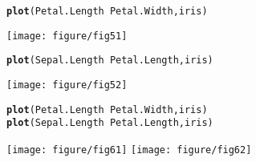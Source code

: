\documentclass{article}\usepackage[]{graphicx}\usepackage[]{color}
\makeatletter
\newcommand{\hlopt}[1]{\textcolor[rgb]{0,0,0}{#1}}%
\newcommand{\hlstd}[1]{\textcolor[rgb]{0.345,0.345,0.345}{#1}}%
\newcommand{\hlkwd}[1]{\textcolor[rgb]{0.737,0.353,0.396}{\textbf{#1}}}%
\newenvironment{kframe}{%
 \def\at@end@of@kframe{}%
 \ifinner\ifhmode%
  \def\at@end@of@kframe{\end{minipage}}%
  \begin{minipage}{\columnwidth}%
 \fi\fi%
 \def\FrameCommand##1{\hskip\@totalleftmargin \hskip-\fboxsep
 \colorbox{shadecolor}{##1}\hskip-\fboxsep
     \hskip-\linewidth \hskip-\@totalleftmargin \hskip\columnwidth}%
 \MakeFramed {\advance\hsize-\width
   \@totalleftmargin\z@ \linewidth\hsize
   \@setminipage}}%
 {\par\unskip\endMakeFramed%
 \at@end@of@kframe}
\newenvironment{knitrout}{}{} %
\makeatother
\begin{document}
\newpage

\begin{knitrout}
\color{fgcolor}\begin{kframe}
\begin{alltt}
\hlkwd{plot}\hlstd{(Petal.Length} \hlopt{~} \hlstd{Petal.Width, iris)}
\end{alltt}
\end{kframe}

{\centering \texttt{[image: figure/fig51]} 

}


\begin{kframe}\begin{alltt}
\hlkwd{plot}\hlstd{(Sepal.Length} \hlopt{~} \hlstd{Petal.Length, iris)}
\end{alltt}
\end{kframe}

{\centering \texttt{[image: figure/fig52]} 

}



\end{knitrout}


\newpage

\begin{knitrout}
\color{fgcolor}\begin{kframe}
\begin{alltt}
\hlkwd{plot}\hlstd{(Petal.Length} \hlopt{~} \hlstd{Petal.Width, iris)}
\hlkwd{plot}\hlstd{(Sepal.Length} \hlopt{~} \hlstd{Petal.Length, iris)}
\end{alltt}
\end{kframe}

{\centering \texttt{[image: figure/fig61]} 
\texttt{[image: figure/fig62]} 

}



\end{knitrout}
\end{document}
